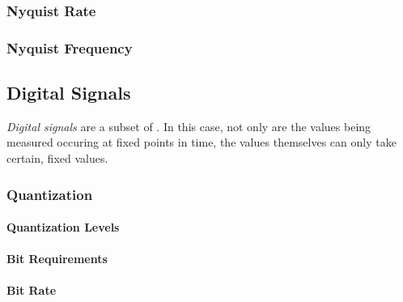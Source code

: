 \subsubsection{Nyquist Rate}\label{subsubsec:Nyquist Rate}
\subsubsection{Nyquist Frequency}\label{subsubsec:Nyquist Frequency}

\subsection{Digital Signals}\label{subsec:Digital Signals}
\begin{definition}\label{def:Digital Signals}
  \emph{Digital signals} are a subset of .
  In this case, not only are the values being measured occuring at fixed points in time, the values themselves can only take certain, fixed values.
\end{definition}

\subsubsection{Quantization}\label{subsubsec:Quantization}
\paragraph{Quantization Levels}\label{par:Quantization Levels}
\paragraph{Bit Requirements}\label{par:Quantization Bit Requirements}
\paragraph{Bit Rate}\label{par:Quantization Bit Rate}
